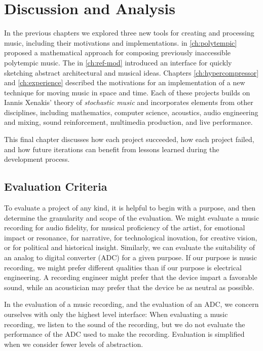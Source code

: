 \clearpage
\chapter{Discussion and Analysis}
\label{ch:analysis}
In the previous chapters we explored three new tools for creating and
processing music, including their motivations and implementations.
\polytempic in \autoref{ch:polytempic} proposed a mathematical
approach for composing previously inaccessible polytempic music. The
 in \autoref{ch:ref-mod} introduced an interface for quickly
sketching abstract architectural and musical ideas.  Chapters
\ref{ch:hypercompressor} and \ref{ch:experience} described the
motivations for an implementation of a new technique for moving music in
space and time. Each of these projects builds on Iannis Xenakis'
theory of \textit{stochastic music} and incorporates elements from
other disciplines, including mathematics, computer science, acoustics,
audio engineering and mixing, sound reinforcement, multimedia
production, and live performance.

This final chapter discusses how each project succeeded, how each
project failed, and how future iterations can benefit from lessons
learned during the development process.

\section{Evaluation Criteria}
\label{sec:eval-criteria}
To evaluate a project of any kind, it is helpful to begin with a
purpose, and then determine the granularity and scope of the
evaluation.\cite{Saltzer2009} We might evaluate a music recording for
audio fidelity, for musical proficiency of the artist, for emotional
impact or resonance, for narrative, for technological inovation, for
creative vision, or for political and historical insight. Similarly,
we can evaluate the suitability of an analog to digital converter
(ADC) for a given purpose. If our purpose is music recording, we might
prefer different qualities than if our purpose is electrical
engineering. A recording engineer might prefer that the device impart a
favorable sound, while an acoustician may prefer that the device be as
neutral as possible.

In the evaluation of a music recording, and the evaluation of an ADC,
we concern ourselves with only the highest level interface: When
evaluating a music recording, we listen to the sound of the
recording, but we do not evaluate the performance of the ADC used to
make the recording. Evaluation is simplified when we consider fewer
levels of abstraction.

